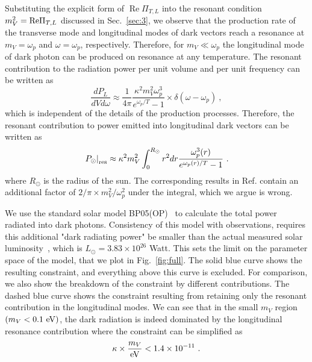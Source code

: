 \documentclass[12pt]{article}
\DeclareMathOperator{\real}{Re}
\begin{document}
Substituting the explicit form of $\real \Pi_{T,L}$ into the resonant condition $m_V^2 = {\rm Re}\Pi_{T,L}$ discussed in Sec.~\ref{sec:3},
we observe that the production rate of the transverse mode and longitudinal modes of dark
vectors reach a resonance at $m_V = \omega_p$ and $\omega = \omega_p$, respectively. Therefore, for
$m_V \ll \omega_p$ the longitudinal mode of dark photon can be produced on resonance at any
temperature. The resonant contribution to the radiation power per unit
volume and per unit frequency can be written as
\begin{equation}
\frac{d P_L}{d V d \omega} \approx \frac{1}{4\pi} \frac{\kappa^2 m_V^2 \omega_p^3}{e^{\omega_p/T} - 1} \times \delta(\omega-\omega_p)\ ,
\end{equation} 
which is independent of the details of the production processes. Therefore, the resonant contribution to power emitted into 
longitudinal dark vectors can be written as
\begin{equation}
\left.P_{\odot}\right|_{\rm res} \approx \kappa^2 m_V^2\int_0^{R_{\odot}} r^2 dr \frac{\omega_p^3(r)}{e^{\omega_p(r)/T} - 1} \ .
\end{equation}
where $R_{\odot}$ is the radius of the sun. The corresponding results in Ref. \cite{Redondo:2008aa} contain an additional 
factor of $2/\pi \times  m_V^2/\omega_p^2$ under the integral, which we argue is wrong. 

We use the standard solar model BP05(OP)~\cite{Bahcall:2004pz} to
calculate the total power radiated into dark photons. Consistency of
this model with observations, requires this additional "dark radiating
power" be smaller than the actual measured solar
luminosity~\cite{Frieman:1987ui,Raffelt:1988rx}, which is $L_\odot =
3.83\times10^{26}$ Watt.  This sets the limit on the parameter space
of the model, that we plot in Fig.~\ref{fig:full}.  The solid blue
curve shows the resulting constraint, and everything above this curve
is excluded.  For comparison, we also show the breakdown of the
constraint by different contributions.  The dashed blue curve shows
the constraint resulting from retaining only the resonant contribution
in the longitudinal modes. We can see that in the small $m_V$ region
$(m_V < 0.1{~\rm eV})$, the dark radiation is indeed dominated by the
longitudinal resonance contribution where the constraint can be
simplified as
\begin{equation}
\kappa \times \frac{m_V}{\rm eV} < 1.4\times10^{-11} \ .
\end{equation}
\end{document}
